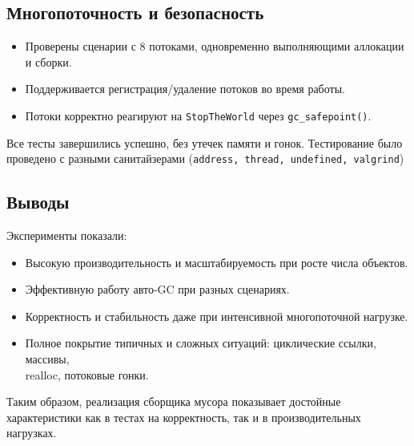 \subsection{Многопоточность и безопасность}

\begin{itemize}
    \item Проверены сценарии с 8 потоками, одновременно выполняющими аллокации и сборки.
    \item Поддерживается регистрация/удаление потоков во время работы.
    \item Потоки корректно реагируют на \texttt{StopTheWorld} через \texttt{gc\_safepoint()}.
\end{itemize}

Все тесты завершились успешно, без утечек памяти и гонок. Тестирование было проведено с разными санитайзерами (\texttt{address, thread, undefined, valgrind})


\subsection{Выводы}

Эксперименты показали:

\begin{itemize}
    \item Высокую производительность и масштабируемость при росте числа объектов.
    \item Эффективную работу авто-GC при разных сценариях.
    \item Корректность и стабильность даже при интенсивной многопоточной нагрузке.
    \item Полное покрытие типичных и сложных ситуаций: циклические ссылки, массивы,\\ realloc, потоковые гонки.
\end{itemize}

Таким образом, реализация сборщика мусора показывает достойные характеристики как в тестах на корректность, так и в производительных нагрузках.

